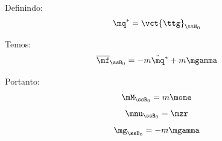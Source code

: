 \documentclass[]{politex}
\begin{document}
Definindo:
\begin{equation}
\mq^\ast = \vct{\ttg}_{\ttN_0}
\end{equation}

Temos:
\begin{equation} \label{eq:Newton-EulerMat2E}
\overline{\mf}_{\ssB_0} = -m \ddot{\mq}^\ast + m \mgamma
\end{equation}

Portanto:
\begin{equation}
\mM_{\ssB_0} = m \mone
\end{equation}
\begin{equation}
\mnu_{\ssB_0} = \mzr
\end{equation}
\begin{equation}
\mg_{\ssB_0} = -m \mgamma
\end{equation}
\end{document}
